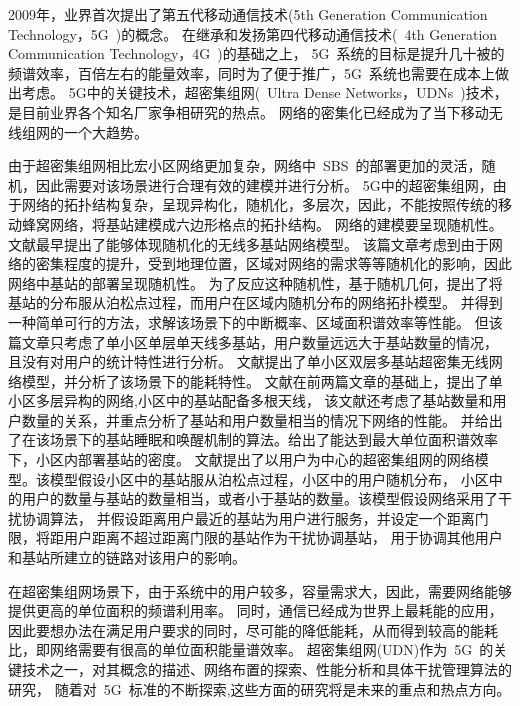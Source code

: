 
2009年，业界首次提出了第五代移动通信技术(5th Generation Communication Technology，5G~)的概念。
在继承和发扬第四代移动通信技术(~4th Generation Communication Technology，4G~)的基础之上，
5G~系统的目标是提升几十被的频谱效率，百倍左右的能量效率，同时为了便于推广，5G~系统也需要在成本上做出考虑。
5G中的关键技术，超密集组网(~Ultra Dense Networks，UDNs~)技术，
是目前业界各个知名厂家争相研究的热点。
网络的密集化已经成为了当下移动无线组网的一个大趋势。

由于超密集组网相比宏小区网络更加复杂，网络中~SBS~的部署更加的灵活，随机，因此需要对该场景进行合理有效的建模并进行分析。
5G中的超密集组网，由于网络的拓扑结构复杂，呈现异构化，随机化，多层次，因此，不能按照传统的移动蜂窝网络，将基站建模成六边形格点的拓扑结构。
网络的建模要呈现随机性。文献\cite{ATractable}最早提出了能够体现随机化的无线多基站网络模型。
该篇文章考虑到由于网络的密集程度的提升，受到地理位置，区域对网络的需求等等随机化的影响，因此网络中基站的部署呈现随机性。
为了反应这种随机性，基于随机几何，提出了将基站的分布服从泊松点过程，而用户在区域内随机分布的网络拓扑模型。
并得到一种简单可行的方法，求解该场景下的中断概率、区域面积谱效率等性能。
但该篇文章只考虑了单小区单层单天线多基站，用户数量远远大于基站数量的情况，
且没有对用户的统计特性进行分析。
文献\cite{2LayerPC}提出了单小区双层多基站超密集无线网络模型，并分析了该场景下的能耗特性。
文献\cite{UDNMIMO}在前两篇文章的基础上，提出了单小区多层异构的网络,小区中的基站配备多根天线，
该文献还考虑了基站数量和用户数量的关系，并重点分析了基站和用户数量相当的情况下网络的性能。
并给出了在该场景下的基站睡眠和唤醒机制的算法。给出了能达到最大单位面积谱效率下，小区内部署基站的密度。
文献\cite{user-centric}提出了以用户为中心的超密集组网的网络模型。该模型假设小区中的基站服从泊松点过程，小区中的用户随机分布，
小区中的用户的数量与基站的数量相当，或者小于基站的数量。该模型假设网络采用了干扰协调算法，
并假设距离用户最近的基站为用户进行服务，并设定一个距离门限，将距用户距离不超过距离门限的基站作为干扰协调基站，
用于协调其他用户和基站所建立的链路对该用户的影响。

在超密集组网场景下，由于系统中的用户较多，容量需求大，因此，需要网络能够提供更高的单位面积的频谱利用率。
同时，通信已经成为世界上最耗能的应用，因此要想办法在满足用户要求的同时，尽可能的降低能耗，从而得到较高的能耗比，即网络需要有很高的单位面积能量谱效率。
超密集组网(UDN)作为~5G~的关键技术之一，对其概念的描述、网络布置的探索、性能分析和具体干扰管理算法的研究，
随着对~5G~标准的不断探索,这些方面的研究将是未来的重点和热点方向。

